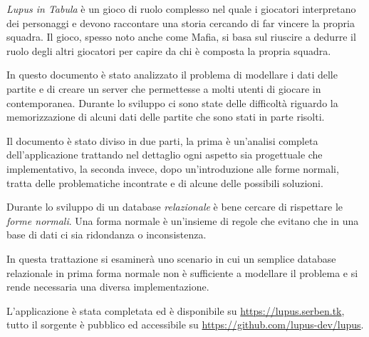 \emph{Lupus in Tabula} è un gioco di ruolo complesso nel quale i giocatori interpretano dei personaggi e devono raccontare una storia cercando di far vincere la propria squadra. Il gioco, spesso noto anche come Mafia\cite{wiki:mafia}, si basa sul riuscire a dedurre il ruolo degli altri giocatori per capire da chi è composta la propria squadra. 

In questo documento è stato analizzato il problema di modellare i dati delle partite e di creare un server che permettesse a molti utenti di giocare in contemporanea. Durante lo sviluppo ci sono state delle difficoltà riguardo la memorizzazione di alcuni dati delle partite che sono stati in parte risolti.

Il documento è stato diviso in due parti, la prima è un'analisi completa dell'applicazione trattando nel dettaglio ogni aspetto sia progettuale che implementativo, la seconda invece, dopo un'introduzione alle forme normali, tratta delle problematiche incontrate e di alcune delle possibili soluzioni.

Durante lo sviluppo di un database \emph{relazionale} è bene cercare di rispettare le \emph{forme normali}. Una forma normale è un'insieme di regole che evitano che in una base di dati ci sia  ridondanza o inconsistenza.

In questa trattazione si esaminerà uno scenario in cui un semplice database relazionale in prima forma normale non è sufficiente a modellare il problema e si rende necessaria una diversa implementazione.

L'applicazione è stata completata ed è disponibile su \url{https://lupus.serben.tk}, tutto il sorgente è pubblico ed accessibile su \url{https://github.com/lupus-dev/lupus}.